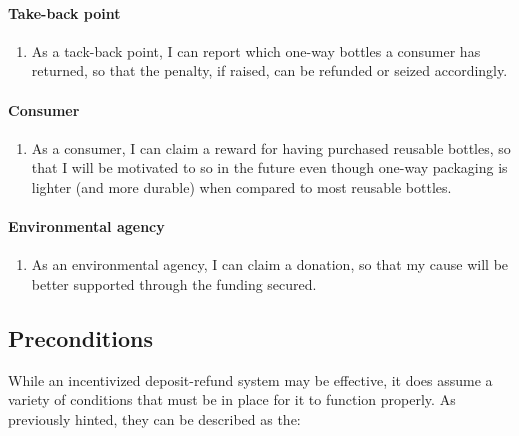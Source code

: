\paragraph{Take-back point}
\begin{enumerate}[resume, label={\textbf{FR-\protect\twodigits{\theenumi}}},leftmargin=*]
	\item As a tack-back point, I can report which one-way bottles a consumer has returned, so that the penalty, if raised, can be refunded or seized accordingly. \label{itm:reportOneWayReturn}
\end{enumerate}

\paragraph{Consumer}
\begin{enumerate}[resume, label={\textbf{FR-\protect\twodigits{\theenumi}}},leftmargin=*]  
	\item As a consumer, I can claim a reward for having purchased reusable bottles, so that I will be motivated to so in the future even though one-way packaging is lighter (and more durable) when compared to most reusable bottles. 
\end{enumerate}

\paragraph{Environmental agency}
\begin{enumerate}[resume, label={\textbf{FR-\protect\twodigits{\theenumi}}},leftmargin=*]  
	\item As an environmental agency, I can claim a donation, so that my cause will be better supported through the funding secured.
\end{enumerate}
	
\subsection{Preconditions}
\label{sec:preconditions}
While an incentivized deposit-refund system may be effective, it does assume a variety of conditions that must be in place for it to function properly. As previously hinted, they can be described as the:

